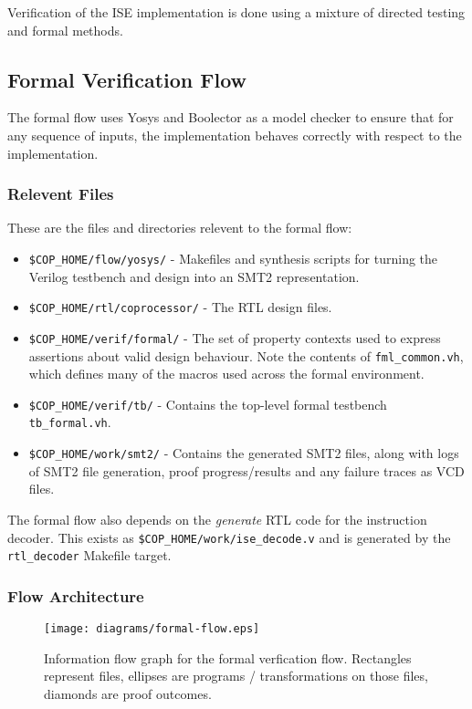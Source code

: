 
Verification of the ISE implementation is done using a mixture of
directed testing and formal methods.

\subsection{Formal Verification Flow}

The formal flow uses Yosys and Boolector as a model checker to ensure that
for any sequence of inputs, the implementation behaves correctly with
respect to the implementation.

\subsubsection{Relevent Files}

These are the files and directories relevent to the formal flow:

\begin{itemize}
\item {\tt \$COP\_HOME/flow/yosys/} - 
    Makefiles and synthesis scripts for turning the Verilog testbench
    and design into an SMT2 representation.
\item {\tt \$COP\_HOME/rtl/coprocessor/} - 
    The RTL design files.
\item {\tt \$COP\_HOME/verif/formal/} - 
    The set of property contexts used to express assertions about valid
    design behaviour. Note the contents of {\tt fml\_common.vh}, which
    defines many of the macros used across the formal environment.
\item {\tt \$COP\_HOME/verif/tb/} - 
    Contains the top-level formal testbench {\tt tb\_formal.vh}.
\item {\tt \$COP\_HOME/work/smt2/} - 
    Contains the generated SMT2 files, along with logs of SMT2 file
    generation, proof progress/results and any failure traces as VCD
    files.
\end{itemize}

The formal flow also depends on the {\em generate} RTL code for the
instruction decoder.
This exists as {\tt \$COP\_HOME/work/ise\_decode.v} and is generated by
the {\tt rtl\_decoder} Makefile target.

\subsubsection{Flow Architecture}

\begin{figure}[h]
\centering
\texttt{[image: diagrams/formal-flow.eps]}
\caption{Information flow graph for the formal verfication flow. Rectangles
represent files, ellipses are programs / transformations on those files,
diamonds are proof outcomes.}
\label{fig:formal-flow}
\end{figure}

